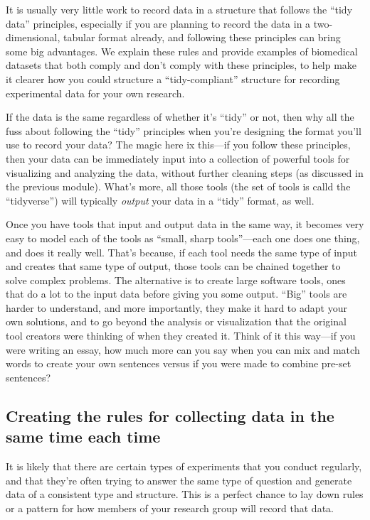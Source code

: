 \documentclass[]{tufte-book}
\begin{document}
It is usually very little work to record data in a structure
that follows the ``tidy data'' principles, especially if you are planning to record
the data in a two-dimensional, tabular format already, and following these
principles can bring some big advantages. We explain these rules and provide
examples of biomedical datasets that both comply and don't comply with these
principles, to help make it clearer how you could structure a ``tidy-compliant''
structure for recording experimental data for your own research.

If the data is the same regardless of whether it's ``tidy'' or not, then why all
the fuss about following the ``tidy'' principles when you're designing the format
you'll use to record your data? The magic here ix this---if you follow these
principles, then your data can be immediately input into a collection of
powerful tools for visualizing and analyzing the data, without further cleaning
steps (as discussed in the previous module). What's more, all those tools (the
set of tools is calld the ``tidyverse'') will typically \emph{output} your data in a
``tidy'' format, as well.

Once you have tools that input and output data in the same way, it becomes very
easy to model each of the tools as ``small, sharp tools''---each one does one
thing, and does it really well. That's because, if each tool needs the same
type of input and creates that same type of output, those tools can be chained
together to solve complex problems. The alternative is to create large software
tools, ones that do a lot to the input data before giving you some output.
``Big'' tools are harder to understand, and more importantly, they make it hard
to adapt your own solutions, and to go beyond the analysis or visualization that
the original tool creators were thinking of when they created it. Think of it this
way---if you were writing an essay, how much more can you say when you can mix and
match words to create your own sentences versus if you were made to combine
pre-set sentences?

\hypertarget{creating-the-rules-for-collecting-data-in-the-same-time-each-time}{%
\subsection{Creating the rules for collecting data in the same time each time}\label{creating-the-rules-for-collecting-data-in-the-same-time-each-time}}

It is likely that there are certain types of experiments that you conduct
regularly, and that they're often trying to answer the same type of
question and generate data of a consistent type and structure. This is
a perfect chance to lay down rules or a pattern for how members of
your research group will record that data.
\end{document}
